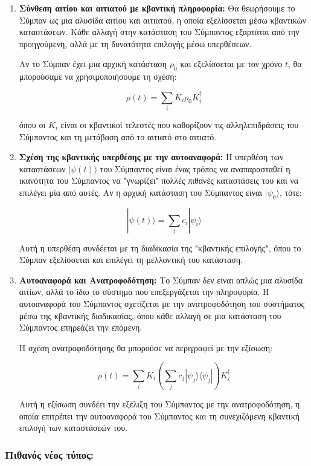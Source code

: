 \documentclass[a4paper,11pt]{article}
\begin{document}
\begin{enumerate}
\item
  \textbf{Σύνθεση αιτίου και αιτιατού με κβαντική πληροφορία:} Θα
  θεωρήσουμε το Σύμπαν ως μια αλυσίδα αιτίου και αιτιατού, η οποία
  εξελίσσεται μέσω κβαντικών καταστάσεων. Κάθε αλλαγή στην κατάσταση του
  Σύμπαντος εξαρτάται από την προηγούμενη, αλλά με τη δυνατότητα
  επιλογής μέσω υπερθέσεων.

  Αν το Σύμπαν έχει μια αρχική κατάσταση {{\(\rho_0\)}} και εξελίσσεται
  με τον χρόνο {{\(t\)}}, θα μπορούσαμε να χρησιμοποιήσουμε τη σχέση:

  {{{\[\rho(t) = \sum_i K_i \rho_0 K_i^\dagger\]}}}

  όπου οι {{\(K_i\)}} είναι οι κβαντικοί τελεστές που καθορίζουν τις
  αλληλεπιδράσεις του Σύμπαντος και τη μετάβαση από το αιτιατό στο
  αιτιατό.
\item
  \textbf{Σχέση της κβαντικής υπερθέσης με την αυτοαναφορά:} Η υπερθέση
  των καταστάσεων {{\(|\psi(t)\rangle\)}} του Σύμπαντος είναι ένας
  τρόπος να αναπαρασταθεί η ικανότητα του Σύμπαντος να "γνωρίζει" πολλές
  πιθανές καταστάσεις του και να επιλέγει μία από αυτές. Αν η αρχική
  κατάσταση του Σύμπαντος είναι {{\(|\psi_0\rangle\)}}, τότε:

  {{{\[|\psi(t)\rangle = \sum_i c_i |\psi_i\rangle\]}}}

  Αυτή η υπερθέση συνδέεται με τη διαδικασία της "κβαντικής επιλογής",
  όπου το Σύμπαν εξελίσσεται και επιλέγει τη μελλοντική του κατάσταση.
\item
  \textbf{Αυτοαναφορά και Ανατροφοδότηση:} Το Σύμπαν δεν είναι απλώς μια
  αλυσίδα αιτίων, αλλά το ίδιο το σύστημα που επεξεργάζεται την
  πληροφορία. Η αυτοαναφορά του Σύμπαντος σχετίζεται με την
  ανατροφοδότηση του συστήματος μέσω της κβαντικής διαδικασίας, όπου
  κάθε αλλαγή σε μια κατάσταση του Σύμπαντος επηρεάζει την επόμενη.

  Η σχέση ανατροφοδότησης θα μπορούσε να περιγραφεί με την εξίσωση:

  {{{\[\rho(t) = \sum_i K_i \left( \sum_j c_j |\psi_j \rangle \langle \psi_j | \right) K_i^\dagger\]}}}

  Αυτή η εξίσωση συνδέει την εξέλιξη του Σύμπαντος με την
  ανατροφοδότηση, η οποία επιτρέπει την αυτοαναφορά του Σύμπαντος και τη
  συνεχιζόμενη κβαντική επιλογή των καταστάσεών του.
\end{enumerate}

\subsubsection{Πιθανός νέος
τύπος:}\label{ux3c0ux3b9ux3b8ux3b1ux3bdux3ccux3c2-ux3bdux3adux3bfux3c2-ux3c4ux3cdux3c0ux3bfux3c2}
\end{document}
